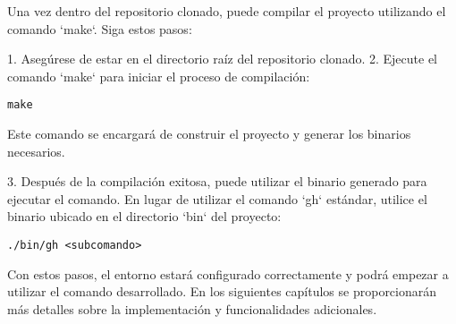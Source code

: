 Una vez dentro del repositorio clonado, puede compilar el proyecto utilizando el comando `make`. Siga estos pasos:

1. Asegúrese de estar en el directorio raíz del repositorio clonado.
2. Ejecute el comando `make` para iniciar el proceso de compilación:

\begin{verbatim}
make
\end{verbatim}

Este comando se encargará de construir el proyecto y generar los binarios necesarios.

3. Después de la compilación exitosa, puede utilizar el binario generado para ejecutar el comando. En lugar de utilizar el comando `gh` estándar, utilice el binario ubicado en el directorio `bin` del proyecto:

\begin{verbatim}
./bin/gh <subcomando>
\end{verbatim}

Con estos pasos, el entorno estará configurado correctamente y podrá empezar a utilizar el comando desarrollado. En los siguientes capítulos se proporcionarán más detalles sobre la implementación y funcionalidades adicionales.